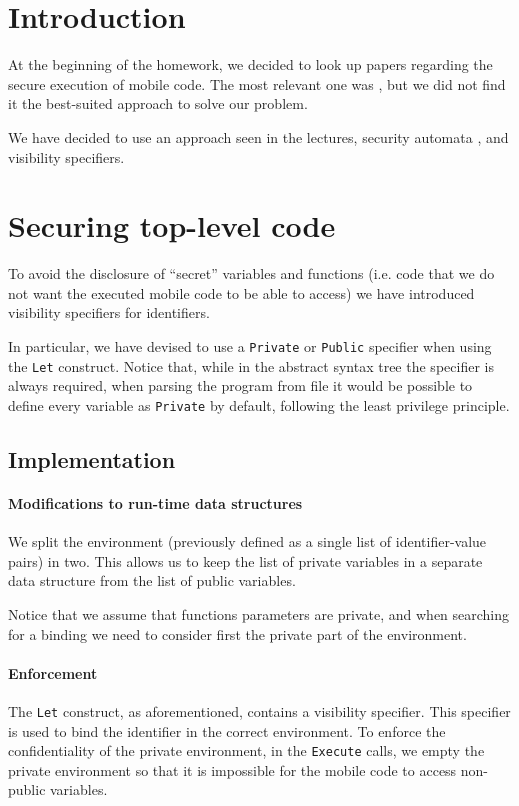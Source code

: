 \section{Introduction}
At the beginning of the homework, we decided to look up papers regarding the secure execution of mobile code. The most relevant one was \cite{history-based}, but we did not find it the best-suited approach to solve our problem.

We have decided to use an approach seen in the lectures, security automata \cite{erlingsson2000sasi,10.1145/353323.353382}, and visibility specifiers.

\section{Securing top-level code}
To avoid the disclosure of ``secret'' variables and functions (i.e. code that we do not want the executed mobile code to be able to access) we have introduced visibility specifiers for identifiers.

In particular, we have devised to use a \lstinline{Private} or \lstinline{Public} specifier when using the \lstinline{Let} construct. Notice that, while in the abstract syntax tree the specifier is always required, when parsing the program from file it would be possible to define every variable as \lstinline{Private} by default, following the least privilege principle.

\subsection{Implementation}

\paragraph{Modifications to run-time data structures}
We split the environment (previously defined as a single list of identifier-value pairs) in two. This allows us to keep the list of private variables in a separate data structure from the list of public variables.

Notice that we assume that functions parameters are private, and when searching for a binding we need to consider first the private part of the environment.

\paragraph{Enforcement}
The \lstinline{Let} construct, as aforementioned, contains a visibility specifier. This specifier is used to bind the identifier in the correct environment.
To enforce the confidentiality of the private environment, in the \lstinline{Execute} calls, we empty the private environment so that it is impossible for the mobile code to access non-public variables.



